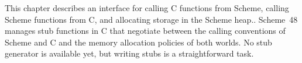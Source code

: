 
%
%
%
%
%
%



\label{external-chapter}

This chapter describes an interface for calling C functions
 from Scheme, calling Scheme functions from C, and allocating
 storage in the Scheme heap..
Scheme~48 manages stub functions in C that
 negotiate between the calling conventions of Scheme and C and the
 memory allocation policies of both worlds.
No stub generator is available yet, but writing stubs is a straightforward task.

